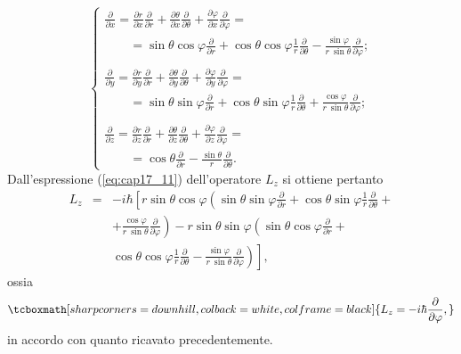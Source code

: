 \begin{equation}
\begin{cases}
\displaystyle{\frac{\partial}{\partial x} = \frac{\partial r}{\partial x}\frac{\partial}{\partial r}+\frac{\partial \theta}{\partial x}\frac{\partial}{\partial \theta}+ \frac{\partial \varphi}{\partial x}\frac{\partial}{\partial \varphi} = }\\
\qquad = \displaystyle{\sin\theta \cos \varphi \frac{\partial}{\partial r}+\cos\theta \cos \varphi\frac{1}{r} \frac{\partial}{\partial \theta}-\frac{\sin \varphi}{r\ \sin \theta} \frac{\partial}{\partial \varphi}}; \\
\\
\displaystyle{\frac{\partial}{\partial y} = \frac{\partial r}{\partial y}\frac{\partial}{\partial r}+\frac{\partial \theta}{\partial y}\frac{\partial}{\partial \theta}+ \frac{\partial \varphi}{\partial y}\frac{\partial}{\partial \varphi} = }\\
\qquad = \displaystyle{\sin\theta \sin \varphi \frac{\partial}{\partial r}+\cos\theta \sin \varphi\frac{1}{r} \frac{\partial}{\partial \theta}+\frac{\cos \varphi}{r\ \sin \theta} \frac{\partial}{\partial \varphi}}; \\
\\
\displaystyle{\frac{\partial}{\partial z} = \frac{\partial r}{\partial z}\frac{\partial}{\partial r}+\frac{\partial \theta}{\partial z}\frac{\partial}{\partial \theta}+ \frac{\partial \varphi}{\partial z}\frac{\partial}{\partial \varphi} = }\\
\qquad = \displaystyle{\cos\theta\frac{\partial}{\partial r}-\frac{\sin \theta}{r} \frac{\partial}{\partial \theta}}.
\end{cases}
\end{equation}
Dall'espressione (\ref{eq:cap17_11}) dell'operatore $L_z$ si ottiene pertanto
\begin{eqnarray}
L_z &=&-i\hbar \left[ r\sin \theta \cos \varphi \left(\sin \theta \sin \varphi \frac{\partial}{\partial r}+\cos \theta \sin \varphi\frac{1}{r} \frac{\partial}{\partial \theta}+ \right.\right. \nonumber \\
& &\left. + \frac{\cos \varphi}{r\ \sin \theta} \frac{\partial}{\partial \varphi}\right) - r \sin \theta \sin \varphi \left( \sin \theta \cos \varphi \frac{\partial}{\partial r}+\right. \nonumber \\
& & \left. \left. \cos \theta \cos \varphi\frac{1}{r} \frac{\partial}{\partial \theta}-\frac{\sin \varphi}{r\ \sin \theta} \frac{\partial}{\partial \varphi}\right)\right] ,
\end{eqnarray}
ossia
	\begin{equation}
		\tcboxmath[sharp corners=downhill, colback=white, colframe=black]{
		L_z = -i\hbar \frac{\partial}{\partial \varphi},
		}
	\end{equation}
in accordo con quanto ricavato precedentemente.\\

